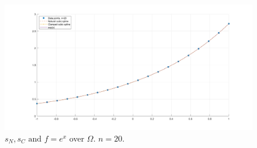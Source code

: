 \documentclass[12pt]{article}
\begin{document}
\begin{figure}[h]
    \centering
    \includegraphics[scale = 0.25]{clmp_nat.png}
    \caption{$s_N, s_C \text{ and } f = e^x$ over $\Omega$. $n=20$.}
\end{figure}
\end{document}
